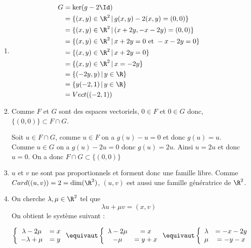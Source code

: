 \documentclass[a4paper, 11pt,reqno]{article}
\begin{document}
\begin{correction}
\begin{enumerate}
\item 
\begin{align*}
G&=\ker( g-2\Id)\\
  &= \{ (x,y)\in \R^2\, |\, g(x,y)-2(x,y) =(0,0)\}\\
  &= \{ (x,y)\in \R^2\, |\, (x+2y,-x-2y) =(0,0)\}\\
  &= \{ (x,y)\in \R^2\, |\, x+2y=0 \text{ et } -x-2y = 0 \}\\
  &= \{ (x,y)\in \R^2\, |\, x+2y=0\}\\
  &= \{ (x,y)\in \R^2\, |\, x=-2y\}\\
  &= \{ (-2y,y)\, |\,y \in \R\}\\
  &=\{ y(-2,1)\, |\,y \in \R\}\\
  &= Vect(( -2,1))
\end{align*}


\item  Comme $F$ et $G$ sont des espaces vectoriels, $0 \in F$ et $0\in G$ donc, 
$\{ (0,0) \} \subset F\cap G$. 


Soit $u \in F\cap G$, comme $u \in F$ on a $g(u)-u=0$ et  donc $g(u)=u$.  Comme $u \in G$ on a $g(u)-2u =0$ donc $g(u) =2u$. Ainsi 
$u=2u$ et donc $u=0$. On a donc $F\cap G\subset \{ (0,0)\}$


\item $u$ et $v$ ne sont pas proportionnels et forment donc une famille libre. Comme $Card((u,v)) = 2 = \dim(\R^2)$, $(u,v)$ est aussi une famille génératrice de $\R^2$. 

\item On cherche $\lambda, \mu \in \R^2$ tel que 
$$\lambda u+\mu v =(x,v)$$
On obtient le système suivant : 

$$\left\{ \begin{array}{cc}
\lambda -2\mu &= x\\
-\lambda +\mu &=y
\end{array}
\right. \equivaut\left\{ \begin{array}{cc}
\lambda -2\mu &= x\\
-\mu &=y+ x
\end{array}
\right. \equivaut\left\{ \begin{array}{cc}
\lambda &= -x-2y\\
\mu &=-y- x
\end{array}
\right.$$


\end{enumerate}
\end{correction}
\end{document}
